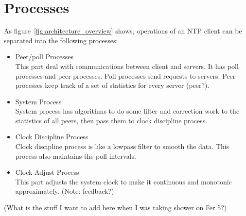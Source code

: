\section{Processes}
\label{sec:processes}
As figure~\ref{fig:architecture_overview} shows, operations of an NTP client
can be separated into the following processes:
\begin{itemize}
    \item Peer/poll Processes\\
        This part deal with communications between client and servers. It has
        poll processes and peer processes. Poll processes send requests to
        servers. Peer processes keep track of a set of statistics for every
        server (peer?). 
    \item System Process\\
        System process has algorithms to do some filter and correction work to
        the statistics of all peers, then pass them to clock discipline
        process.
    \item Clock Discipline Process\\
        Clock discipline process is like a lowpass filter to smooth the data.
        This process also maintains the poll intervals.
    \item Clock Adjust Process\\
        This part adjusts the system clock to make it continuous and monotonic
        approximately. (Note: feedback?)
\end{itemize}



(What is the stuff I want to add here when I was taking shower on Fer 5?)

